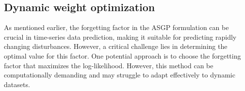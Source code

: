 





\subsection{Dynamic weight optimization}


As mentioned earlier, the forgetting factor in the \ac{ASGP} formulation can be crucial in time-series data prediction, making it suitable for predicting rapidly changing disturbances. However, a critical challenge lies in determining the optimal value for this factor. One potential approach is to choose the forgetting factor that maximizes the log-likelihood. However, this method can be computationally demanding and may struggle to adapt effectively to dynamic datasets.


